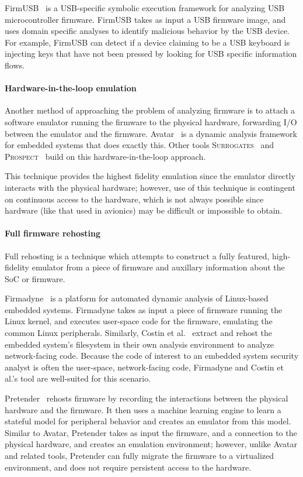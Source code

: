 FirmUSB~\cite{firmusb} is a USB-specific symbolic execution framework for analyzing USB microcontroller firmware. 
FirmUSB takes as input a USB firmware image, and uses domain specific analyses  to identify malicious behavior by the USB device.
For example, FirmUSB can detect if a device claiming to be a USB keyboard is injecting keys that have not been pressed by looking for USB specific information flows.

\paragraph{Hardware-in-the-loop emulation} 
Another method of approaching the problem of analyzing firmware is to attach a software emulator running the firmware to the physical hardware, forwarding I/O between the emulator and the firmware.
Avatar~\cite{avatar} is a dynamic analysis framework for embedded systems that does exactly this.
Other tools 
\textsc{Surrogates}~\cite{surrogates} and \textsc{Prospect}~\cite{kammerstetter2014prospect} build on this hardware-in-the-loop approach.

This technique provides the highest fidelity emulation since the emulator directly interacts with the physical hardware; however, use of this technique is contingent on continuous access to the hardware, which is not always possible since hardware (like that used in avionics) may be difficult or impossible to obtain.

\paragraph{Full firmware rehosting} 
Full rehosting is a technique which attempts to construct a fully featured, high-fidelity emulator from a piece of firmware and auxillary information about the SoC or firmware.

Firmadyne~\cite{firmadyne} is a platform for automated dynamic analysis of Linux-based embedded systems.
Firmadyne takes as input a piece of firmware running the Linux kernel, and executes user-space code for the firmware, emulating the common Linux peripherals.
Similarly, Costin et al.~\cite{costin2014large, costin2016automated} extract and rehost the embedded system's filesystem in their own analysis environment to analyze network-facing code.
Because the code of interest to an embedded system security analyst is often the user-space, network-facing code, Firmadyne and Costin et al.'s tool are well-suited for this scenario. 

Pretender~\cite{pretender2019} rehosts firmware by recording the interactions between the physical hardware and the firmware. 
It then uses a machine learning engine to learn a stateful model for peripheral behavior and creates an emulator from this model.
Similar to Avatar, Pretender takes as input the firmware, and a connection to the physical hardware, and creates an emulation environment; however, unlike Avatar and related tools, Pretender can fully migrate the firmware to a virtualized environment, and does not require persistent access to the hardware.


